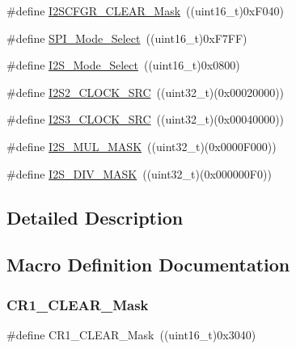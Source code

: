 \begin{DoxyCompactItemize}
\item 
\#define \mbox{\hyperlink{group___s_p_i___private___defines_ga6cd1ac4e83d8de8e32a407d1a7971389}{I2\+S\+C\+F\+G\+R\+\_\+\+C\+L\+E\+A\+R\+\_\+\+Mask}}~((uint16\+\_\+t)0x\+F040)
\item 
\#define \mbox{\hyperlink{group___s_p_i___private___defines_ga71da9dd90bf7bfb6ed1748a1e181677a}{S\+P\+I\+\_\+\+Mode\+\_\+\+Select}}~((uint16\+\_\+t)0x\+F7\+F\+F)
\item 
\#define \mbox{\hyperlink{group___s_p_i___private___defines_ga196b1b58421a7ee7dba0b46fb33c621b}{I2\+S\+\_\+\+Mode\+\_\+\+Select}}~((uint16\+\_\+t)0x0800)
\item 
\#define \mbox{\hyperlink{group___s_p_i___private___defines_gae1190efd6dbcd06a9c03f4d499d28e4c}{I2\+S2\+\_\+\+C\+L\+O\+C\+K\+\_\+\+S\+RC}}~((uint32\+\_\+t)(0x00020000))
\item 
\#define \mbox{\hyperlink{group___s_p_i___private___defines_gabb67971448c15090f3372e3875db3d23}{I2\+S3\+\_\+\+C\+L\+O\+C\+K\+\_\+\+S\+RC}}~((uint32\+\_\+t)(0x00040000))
\item 
\#define \mbox{\hyperlink{group___s_p_i___private___defines_gaf9cca755995c8e8f7a4012709ca468f2}{I2\+S\+\_\+\+M\+U\+L\+\_\+\+M\+A\+SK}}~((uint32\+\_\+t)(0x0000\+F000))
\item 
\#define \mbox{\hyperlink{group___s_p_i___private___defines_ga26cdb43c45ac655c792c5af0a6bbb0bf}{I2\+S\+\_\+\+D\+I\+V\+\_\+\+M\+A\+SK}}~((uint32\+\_\+t)(0x000000\+F0))
\end{DoxyCompactItemize}


\subsection{Detailed Description}


\subsection{Macro Definition Documentation}
\mbox{\label{group___s_p_i___private___defines_ga67f7dd35ea3d1296677e5fc50b88fa90}} 
\subsubsection{\texorpdfstring{CR1\_CLEAR\_Mask}{CR1\_CLEAR\_Mask}}
{\footnotesize\ttfamily \#define C\+R1\+\_\+\+C\+L\+E\+A\+R\+\_\+\+Mask~((uint16\+\_\+t)0x3040)}

